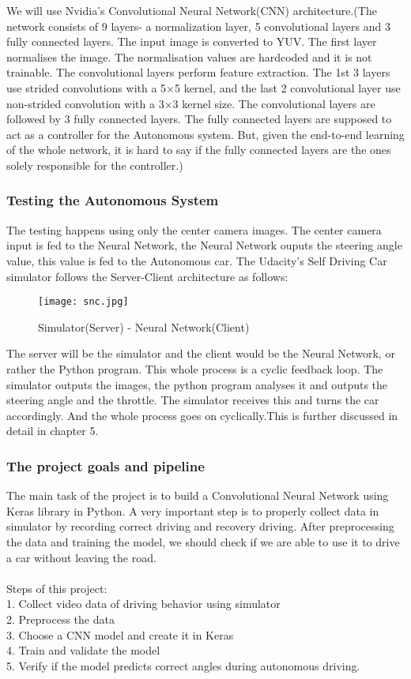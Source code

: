 We will use Nvidia’s Convolutional Neural Network(CNN) architecture.(The network consists of 9 layers- a normalization layer, 5 convolutional layers and 3 fully connected layers. The input image is converted to YUV. The first layer normalises the image. The normalisation values are hardcoded and it is not trainable. The convolutional layers perform feature extraction. The 1st 3 layers use strided convolutions with a 5×5 kernel, and the last 2 convolutional layer use non-strided convolution with a 3×3 kernel size. The convolutional layers are followed by 3 fully connected layers. The fully connected layers are supposed to act as a controller for the Autonomous system. But, given the end-to-end learning of the whole network, it is hard to say if the fully connected layers are the ones solely responsible for the controller.)

\subsubsection{Testing the Autonomous System}
The testing happens using only the center camera images. The center camera input is fed to the Neural Network, the Neural Network ouputs the steering angle value, this value is fed to the Autonomous car. The Udacity’s Self Driving Car simulator follows the Server-Client architecture as follows:
\begin{figure}[H]
	\centering
	\texttt{[image: snc.jpg]}
	\caption{Simulator(Server) - Neural Network(Client)}
\end{figure}

The server will be the simulator and the client would be the Neural Network, or rather the Python program. This whole process is a cyclic feedback loop. The simulator outputs the images, the python program analyses it and outputs the steering angle and the throttle. The simulator receives this and turns the car accordingly. And the whole process goes on cyclically.This is further discussed in detail in chapter 5.


\subsubsection{The project goals and pipeline}
The main task of the project is to build a Convolutional Neural Network using Keras library in Python. A very important step is to properly collect data in simulator by recording correct driving and recovery driving. After preprocessing the data and training the model, we should check if we are able to use it to drive a car without leaving the road.\\\\
Steps of this project:\\
1.	Collect video data of driving behavior using simulator\\
2.	Preprocess the data\\
3.	Choose a CNN model and create it in Keras\\
4.	Train and validate the model\\
5.	Verify if the model predicts correct angles during autonomous driving.

